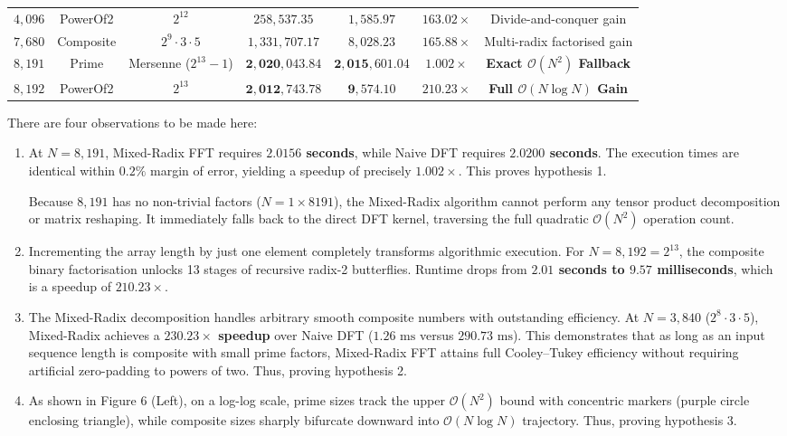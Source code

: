 \documentclass{article}
\begin{document}
\begin{table}[H]
{\begin{tabular}{@{}rcccccc@{}}
$4,096$  & PowerOf2  & $2^{12}$                & $258,537.35$  & $1,585.97$    & $163.02\times$        & Divide-and-conquer gain \\
$7,680$  & Composite & $2^9 \cdot 3 \cdot 5$   & $1,331,707.17$& $8,028.23$    & $165.88\times$        & Multi-radix factorised gain \\
$8,191$  & Prime     & Mersenne ($2^{13}-1$)   & $\mathbf{2,020,043.84}$ & $\mathbf{2,015,601.04}$ & $\mathbf{1.002\times}$ & \textbf{Exact $\mathcal{O}(N^2)$ Fallback} \\
$8,192$  & PowerOf2  & $2^{13}$                & $\mathbf{2,012,743.78}$ & $\mathbf{9,574.10}$     & $\mathbf{210.23\times}$ & \textbf{Full $\mathcal{O}(N \log N)$ Gain} \\
\bottomrule
\end{tabular}%
}
\end{table}
There are four observations to be made here:
\begin{enumerate}
  \item At $N = 8,191$, Mixed-Radix FFT requires \textbf{$2.0156$ seconds}, while Naive DFT requires \textbf{$2.0200$ seconds}. The execution times are identical within $0.2\%$ margin of error, yielding a speedup of precisely \textbf{$\mathbf{1.002\times}$}. This proves hypothesis 1.
    
    Because $8,191$ has no non-trivial factors ($N = 1 \times 8191$), the Mixed-Radix algorithm cannot perform any tensor product decomposition or matrix reshaping. It immediately falls back to the direct DFT kernel, traversing the full quadratic $\mathcal{O}(N^2)$ operation count.
    \item  Incrementing the array length by just one element completely transforms algorithmic execution. For $N = 8,192 = 2^{13}$, the composite binary factorisation unlocks 13 stages of recursive radix-2 butterflies. Runtime drops from \textbf{$2.01$ seconds to $9.57$ milliseconds}, which is a speedup of \textbf{$\mathbf{210.23\times}$}.
    \item The Mixed-Radix decomposition handles arbitrary smooth composite numbers with outstanding efficiency. At $N = 3,840$ ($2^8 \cdot 3 \cdot 5$), Mixed-Radix achieves a \textbf{$\mathbf{230.23\times}$ speedup} over Naive DFT ($1.26\text{ ms}$ versus $290.73\text{ ms}$). This demonstrates that as long as an input sequence length is composite with small prime factors, Mixed-Radix FFT attains full Cooley--Tukey efficiency without requiring artificial zero-padding to powers of two. Thus, proving hypothesis 2.

    \item As shown in Figure 6 (Left), on a log-log scale, prime sizes track the upper $\mathcal{O}(N^2)$ bound with concentric markers (purple circle enclosing triangle), while composite sizes sharply bifurcate downward into $\mathcal{O}(N \log N)$ trajectory. Thus, proving hypothesis 3.
\end{enumerate}
\end{document}
